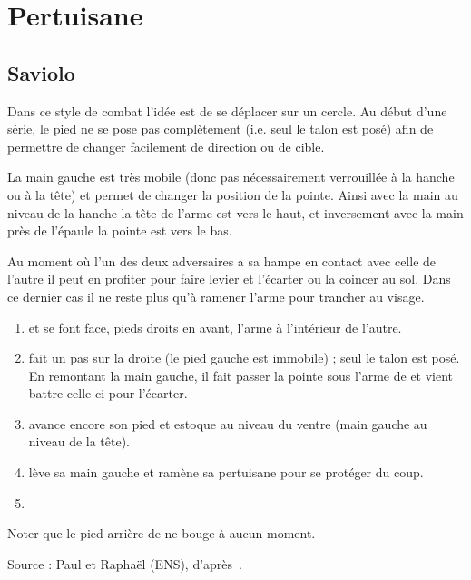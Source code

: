 \chapter{Pertuisane}

\section{Saviolo}

Dans ce style de combat l'idée est de se déplacer sur un cercle. Au début d'une série, le pied ne se pose pas complètement (i.e. seul le talon est posé) afin de permettre de changer facilement de direction ou de cible.

La main gauche est très mobile (donc pas nécessairement verrouillée à la hanche ou à la tête) et permet de changer la position de la pointe. Ainsi avec la main au niveau de la hanche la tête de l'arme est vers le haut, et inversement avec la main près de l'épaule la pointe est vers le bas.

Au moment où l'un des deux adversaires a sa hampe en contact avec celle de l'autre il peut en profiter pour faire levier et l'écarter ou la coincer au sol. Dans ce dernier cas il ne reste plus qu'à ramener l'arme pour trancher au visage.

\begin{exercice}
\begin{enumerate}
	\item \A et \D se font face, pieds droits en avant, l'arme à l'intérieur de l'autre.
	
	\item \A fait un pas sur la droite (le pied gauche est immobile) ; seul le talon est posé. En remontant la main gauche, il fait passer la pointe sous l'arme de \D et vient battre celle-ci pour l'écarter.
	
	\item \A avance encore son pied et estoque au niveau du ventre (main gauche au niveau de la tête).
	
	\item \D lève sa main gauche et ramène sa pertuisane pour se protéger du coup.
	
	\item {}
\end{enumerate}

Noter que le pied arrière de \A ne bouge à aucun moment.

Source : Paul et Raphaël (ENS), d'après~\cite{livermore:cornucopia:partizan:2014}.
\end{exercice}

